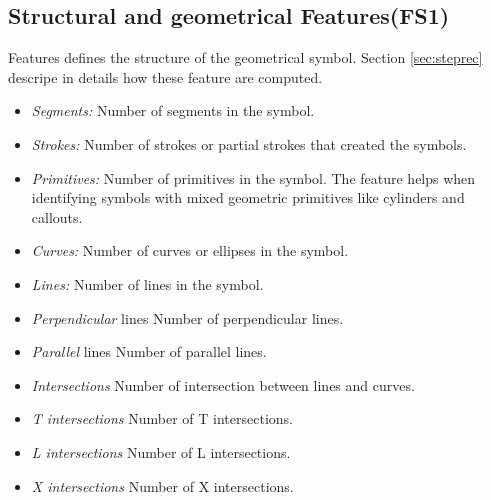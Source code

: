 \subsection{Structural and geometrical Features(FS1)}
Features defines the structure of the geometrical symbol. Section \ref{sec:steprec} descripe in details how these feature are computed. 
  \begin{itemize}
	 \item \emph{Segments:} Number of segments in the symbol.
	 \item \emph{Strokes:} Number of strokes or partial strokes that created the symbols.  
		\item  \emph{Primitives:} Number of primitives in the symbol. The feature helps when identifying             symbols with mixed geometric primitives like cylinders and callouts.  
		\item \emph{Curves:} Number of curves or ellipses in the symbol. 
		\item \emph{Lines:} Number of lines in the symbol. 
		\item \emph{Perpendicular} lines Number of perpendicular lines. 
		\item \emph{Parallel} lines Number of parallel lines. 
		\item \emph{Intersections} Number of intersection between lines and curves. 
		\item \emph{T intersections} Number of T intersections. 
		\item \emph{L intersections} Number of L intersections. 
		\item \emph{X intersections} Number of X intersections.
	
\end{itemize}
